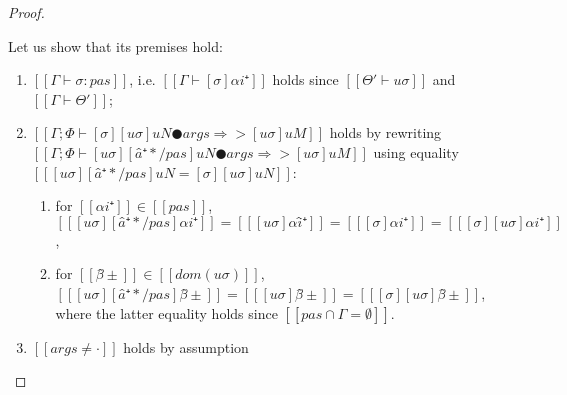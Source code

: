 \begin{proof}
\begin{caseof}
\begin{enumerate}
            Let us show that its premises hold:
            \begin{enumerate}
                \item $[[Γ ⊢ σ : pas]]$, i.e.
                $[[ Γ ⊢ [σ] αi⁺ ]]$ holds since $[[ Θ' ⊢ uσ ]]$ and $[[Γ ⊢ Θ']]$;
                \item $[[Γ; Φ ⊢ [σ][uσ]uN ● args ⇒> [uσ]uM ]]$ 
                    holds by rewriting 
                    $[[ Γ ; Φ ⊢ [uσ][â⁺*/pas]uN ● args ⇒> [uσ]uM ]]$
                    using equality $[[ [uσ][â⁺*/pas]uN = [σ][uσ]uN ]]$:
                    \begin{enumerate}
                        \item for $[[ αi⁺ ]] \in [[ pas ]]$, $[[ [uσ][â⁺*/pas] αi⁺ ]] = [[ [uσ]αî⁺ ]] = [[ [σ]αi⁺ ]] = [[ [σ][uσ]αi⁺ ]]$,
                        \item for $[[ β̂± ]] \in [[ dom(uσ) ]]$, $[[ [uσ][â⁺*/pas]β̂±  ]] = [[ [uσ]β̂±  ]] = [[ [σ][uσ]β̂± ]] $, 
                            where the latter equality holds since $[[ {pas} ∩ {Γ} = ∅ ]]$.
                    \end{enumerate}

                \item $[[args ≠ ·]]$ holds by assumption
            \end{enumerate}
        \end{enumerate}
    \end{caseof}
\end{proof}

